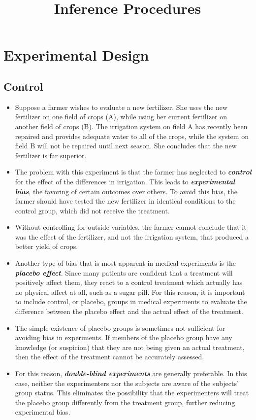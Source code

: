 \documentclass[12pt]{article}
\title{Inference Procedures}
\begin{document}
\Large
\section*{Experimental Design}

\subsection*{Control}
\begin{itemize}
\item Suppose a farmer wishes to evaluate a new fertilizer. She uses the new fertilizer on one field of crops (A), while using her current fertilizer on another field of crops (B). The irrigation system on field A has recently been repaired and provides adequate water to all of the crops, while the system on field B will not be repaired until next season. She concludes that the new fertilizer is far superior.
\item The problem with this experiment is that the farmer has neglected to \textit{\textbf{control}} for the effect of the differences in irrigation. This leads to \textbf{\textit{experimental bias}}, the favoring of certain outcomes over others. To avoid this bias, the farmer should have tested the new fertilizer in identical conditions to the control group, which did not receive the treatment. 
\item Without controlling for outside variables, the farmer cannot conclude that it was the effect of the fertilizer, and not the irrigation system, that produced a better yield of crops.

\item Another type of bias that is most apparent in medical experiments is the \textit{\textbf{placebo effect}}. Since many patients are confident that a treatment will positively affect them, they react to a control treatment which actually has no physical affect at all, such as a sugar pill. For this reason, it is important to include control, or placebo, groups in medical experiments to evaluate the difference between the placebo effect and the actual effect of the treatment.

\item The simple existence of placebo groups is sometimes not sufficient for avoiding bias in experiments. If members of the placebo group have any knowledge (or suspicion) that they are not being given an actual treatment, then the effect of the treatment cannot be accurately assessed. 
\item For this reason, \textit{\textbf{double-blind experiments}} are generally preferable. In this case, neither the experimenters nor the subjects are aware of the subjects' group status. This eliminates the possibility that the experimenters will treat the placebo group differently from the treatment group, further reducing experimental bias.
\end{itemize}
\end{document}
